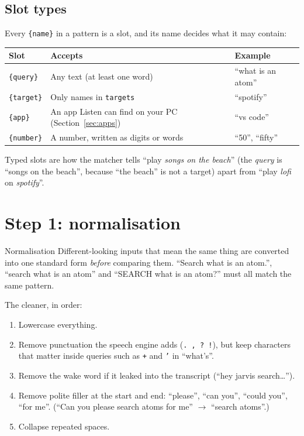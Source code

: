 \documentclass[11pt,a4paper]{article}
\begin{document}
\subsection{Slot types}
Every \texttt{\{name\}} in a pattern is a slot, and its name decides what it may contain:

\begin{center}
\renewcommand{\arraystretch}{1.2}
\begin{tabularx}{\textwidth}{l X l}
\toprule
\textbf{Slot} & \textbf{Accepts} & \textbf{Example} \\
\midrule
\texttt{\{query\}}  & Any text (at least one word) & ``what is an atom'' \\
\texttt{\{target\}} & Only names in \texttt{targets} & ``spotify'' \\
\texttt{\{app\}}    & An app Listen can find on your PC (Section~\ref{sec:apps}) & ``vs code'' \\
\texttt{\{number\}} & A number, written as digits or words & ``50'', ``fifty'' \\
\bottomrule
\end{tabularx}
\end{center}

\noindent Typed slots are how the matcher tells ``play \emph{songs on the beach}'' (the
\emph{query} is ``songs on the beach'', because ``the beach'' is not a target) apart from
``play \emph{lofi} on \emph{spotify}''.

\section{Step 1: normalisation}

\begin{concept}{Normalisation}
Different-looking inputs that mean the same thing are converted into one standard form
\emph{before} comparing them. ``Search what is an atom.'', ``search what is an atom'' and
``SEARCH what is an atom?'' must all match the same pattern.
\end{concept}

\noindent The cleaner, in order:
\begin{enumerate}[nosep]
  \item Lowercase everything.
  \item Remove punctuation the speech engine adds (\texttt{. , ? !}), but keep characters
        that matter inside queries such as \texttt{+} and \texttt{'} in ``what's''.
  \item Remove the wake word if it leaked into the transcript (``hey jarvis search\ldots'').
  \item Remove polite filler at the start and end: ``please'', ``can you'', ``could you'',
        ``for me''. (``Can you please search atoms for me'' $\to$ ``search atoms''.)
  \item Collapse repeated spaces.
\end{enumerate}
\end{document}
